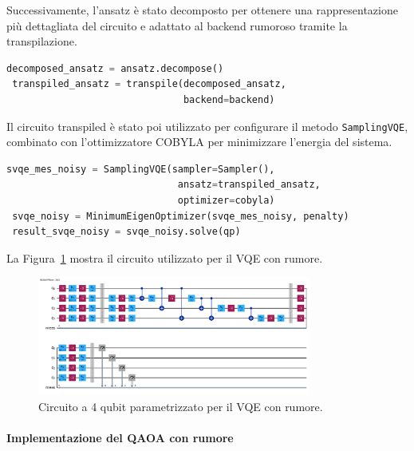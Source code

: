 Successivamente, l'ansatz è stato decomposto per ottenere una rappresentazione più 
dettagliata del circuito e adattato al backend rumoroso tramite la transpilazione.

\begin{lstlisting}[language=python, caption={Decomposizione e transpilazione dell'ansatz per il backend rumoroso.}]
 decomposed_ansatz = ansatz.decompose()
 transpiled_ansatz = transpile(decomposed_ansatz, 
                               backend=backend)
\end{lstlisting}

Il circuito transpiled è stato poi utilizzato per configurare il metodo \texttt{SamplingVQE}, 
combinato con l'ottimizzatore COBYLA per minimizzare l'energia del sistema.

\begin{lstlisting}[language=python, caption={Configurazione e risoluzione del VQE con rumore.}]
 svqe_mes_noisy = SamplingVQE(sampler=Sampler(), 
                              ansatz=transpiled_ansatz, 
                              optimizer=cobyla)
 svqe_noisy = MinimumEigenOptimizer(svqe_mes_noisy, penalty)
 result_svqe_noisy = svqe_noisy.solve(qp)
\end{lstlisting}

La Figura~\ref{fig:vqe_noisy_circuit} mostra il circuito utilizzato per il VQE con rumore.

\begin{figure}[h!]
    \centering
    \includegraphics[width=0.8\textwidth]{images/circuitoVQEnoisy.png}
    \caption{Circuito a 4 qubit parametrizzato per il VQE con rumore.}
    \label{fig:vqe_noisy_circuit}
\end{figure}




\paragraph{Implementazione del QAOA con rumore}

